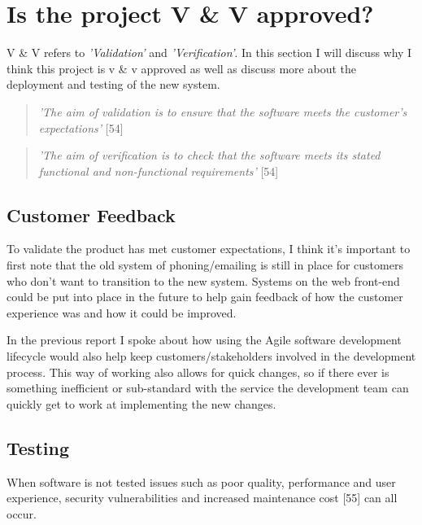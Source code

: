 \section{Is the project V \& V approved?}
  V \& V refers to \textit{'Validation'} and \textit{'Verification'}. In this section I will discuss why I think this project is v \&
  v approved as well as discuss more about the deployment and testing of the new system.

  \begin{quote}
    \textit{'The aim of validation is to ensure that the software meets the customer's expectations'} [54]
  \end{quote}

  \begin{quote}
    \textit{'The aim of verification is to check that the software meets its stated functional and non-functional requirements'} [54]
  \end{quote}


  \subsection{Customer Feedback}
  To validate the product has met customer expectations, I think it's important to first note that the old system of phoning/emailing is still in 
  place for customers who don't want to transition to the new system. Systems on the web front-end could be put into place in the future to help 
  gain feedback of how the customer experience was and how it could be improved.

  In the previous report I spoke about how using the Agile software development lifecycle would also help keep customers/stakeholders involved in the 
  development process. This way of working also allows for quick changes, so if there ever is something inefficient or sub-standard with the service the 
  development team can quickly get to work at implementing the new changes.
  
  \subsection{Testing}
  \label{sec:Testing}

  When software is not tested issues such as poor quality, performance and user experience, security vulnerabilities and increased maintenance cost [55]
  can all occur.

